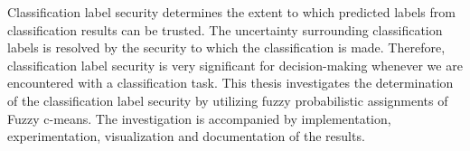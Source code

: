 
\begin{Referat}
	Classification label security determines the extent to which predicted labels from classification results can be trusted. The uncertainty surrounding classification labels is resolved by the security to which the classification is made. Therefore, classification label security is very significant for decision-making whenever we are encountered with a classification task. This thesis investigates the determination of the classification label security by utilizing fuzzy probabilistic assignments of Fuzzy c-means. The investigation is accompanied by implementation, experimentation, visualization and documentation of the results.
\end{Referat}
